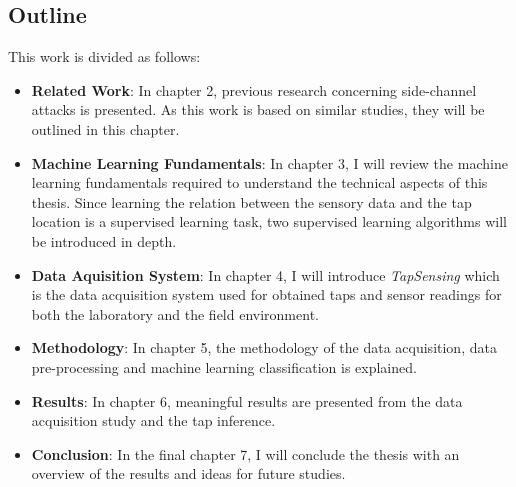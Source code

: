 \subsection{Outline}

This work is divided as follows:
\begin{itemize}
  \item \textbf{Related Work}: In chapter 2, previous research concerning side-channel attacks is presented. As this work is based on similar studies, they will be outlined in this chapter.
  \item \textbf{Machine Learning Fundamentals}: In chapter 3, I will review the machine learning fundamentals required to understand the technical aspects of this thesis. Since learning the relation between the sensory data and the tap location is a supervised learning task, two supervised learning algorithms will be introduced in depth.
  \item \textbf{Data Aquisition System}: In chapter 4, I will introduce \textit{TapSensing} which is the data acquisition system used for obtained taps and sensor readings for both the laboratory and the field environment.
  \item \textbf{Methodology}: In chapter 5, the methodology of the data acquisition, data pre-processing and machine learning classification is explained.
  \item \textbf{Results}: In chapter 6, meaningful results are presented from the data acquisition study and the tap inference.
  \item \textbf{Conclusion}: In the final chapter 7, I will conclude the thesis with an overview of the results and ideas for future studies.
\end{itemize}






